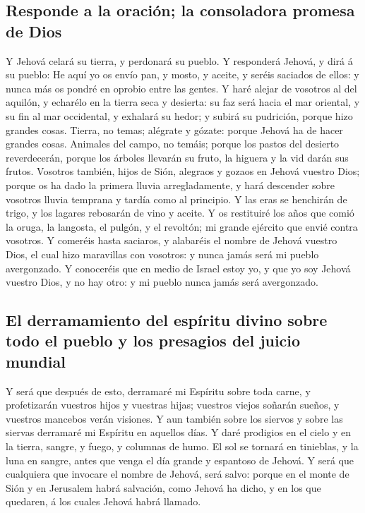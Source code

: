 \hypertarget{responde-a-la-oraciuxf3n-la-consoladora-promesa-de-dios}{%
\subsection{Responde a la oración; la consoladora promesa de
Dios}\label{responde-a-la-oraciuxf3n-la-consoladora-promesa-de-dios}}

 Y Jehová celará su tierra, y perdonará su pueblo.
 Y responderá Jehová, y dirá á su pueblo: He aquí yo os
envío pan, y mosto, y aceite, y seréis saciados de ellos: y nunca más os
pondré en oprobio entre las gentes.  Y haré alejar de
vosotros al del aquilón, y echarélo en la tierra seca y desierta: su faz
será hacia el mar oriental, y su fin al mar occidental, y exhalará su
hedor; y subirá su pudrición, porque hizo grandes cosas. 
Tierra, no temas; alégrate y gózate: porque Jehová ha de hacer grandes
cosas.  Animales del campo, no temáis; porque los pastos
del desierto reverdecerán, porque los árboles llevarán su fruto, la
higuera y la vid darán sus frutos.  Vosotros también, hijos
de Sión, alegraos y gozaos en Jehová vuestro Dios; porque os ha dado la
primera lluvia arregladamente, y hará descender sobre vosotros lluvia
temprana y tardía como al principio.  Y las eras se
henchirán de trigo, y los lagares rebosarán de vino y aceite.
 Y os restituiré los años que comió la oruga, la langosta,
el pulgón, y el revoltón; mi grande ejército que envié contra vosotros.
 Y comeréis hasta saciaros, y alabaréis el nombre de Jehová
vuestro Dios, el cual hizo maravillas con vosotros: y nunca jamás será
mi pueblo avergonzado.  Y conoceréis que en medio de Israel
estoy yo, y que yo soy Jehová vuestro Dios, y no hay otro: y mi pueblo
nunca jamás será avergonzado.

\hypertarget{el-derramamiento-del-espuxedritu-divino-sobre-todo-el-pueblo-y-los-presagios-del-juicio-mundial}{%
\subsection{El derramamiento del espíritu divino sobre todo el pueblo y
los presagios del juicio
mundial}\label{el-derramamiento-del-espuxedritu-divino-sobre-todo-el-pueblo-y-los-presagios-del-juicio-mundial}}

 Y será que después de esto, derramaré mi Espíritu sobre
toda carne, y profetizarán vuestros hijos y vuestras hijas; vuestros
viejos soñarán sueños, y vuestros mancebos verán visiones. 
Y aun también sobre los siervos y sobre las siervas derramaré mi
Espíritu en aquellos días.  Y daré prodigios en el cielo y
en la tierra, sangre, y fuego, y columnas de humo.  El sol
se tornará en tinieblas, y la luna en sangre, antes que venga el día
grande y espantoso de Jehová.  Y será que cualquiera que
invocare el nombre de Jehová, será salvo: porque en el monte de Sión y
en Jerusalem habrá salvación, como Jehová ha dicho, y en los que
quedaren, á los cuales Jehová habrá llamado.

